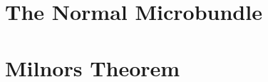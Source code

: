 \section{The Normal Microbundle}\label{section::normal}


\section{Milnors Theorem}\label{section::milnor}





